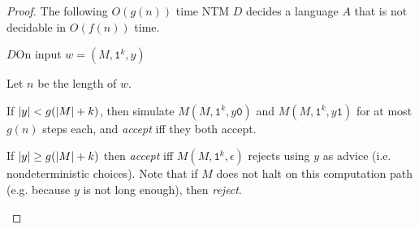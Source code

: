 \begin{proof}
  The following $O(g(n))$ time NTM $D$ decides a language $A$ that is not decidable in $O(f(n))$ time.

  \begin{turing}{$D$}{On input $w = (M, \texttt{1}^k, y)$}
  \item Let $n$ be the length of $w$.
  \item If $| y | < g(| M | + k)$, then simulate $M(M, \texttt{1}^k, y\texttt{0})$ and $M(M, \texttt{1}^k, y\texttt{1})$ for at most $g(n)$ steps each, and \emph{accept} iff they both accept.
  \item If $| y | \geq g(| M | + k)$ then \emph{accept} iff $M(M, \texttt{1}^k, \epsilon)$ rejects using $y$ as advice (i.e. nondeterministic choices). Note that if $M$ does not halt on this computation path (e.g. because $y$ is not long enough), then \emph{reject}.
  \end{turing}


\end{proof}
